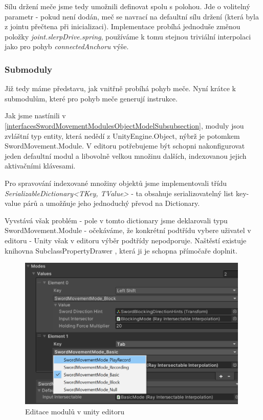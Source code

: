 Sílu držení meče jsme tedy umožnili definovat spolu s polohou. Jde o volitelný parametr - pokud není dodán, meč se navrací na defaultní sílu držení (která byla z jointu přečtena při inicializaci). Implementace probíhá jednoduše změnou položky \textit{joint.slerpDrive.spring}, používáme k tomu stejnou triviální interpolaci jako pro pohyb \textit{connectedAnchoru} výše.

\subsubsection*{Submoduly} \label{implementationSwordSubmodulesSubsubsection}

Již tedy máme představu, jak vnitřně probíhá pohyb meče. Nyní krátce k submodulům, které pro pohyb meče generují instrukce. 

Jak jsme nastínili v \ref{interfacesSwordMovementModulesObjectModelSubsubsection}, moduly jsou zvláštní typ entity, která nedědí z UnityEngine.Object, nýbrž je potomkem SwordMovement.Module. V editoru potřebujeme být schopni nakonfigurovat jeden defaultní modul a libovolně velkou množinu dalších, indexovanou jejich aktivačními klávesami.

Pro spravování indexované množiny objektů jsme implementovali třídu \textit{SerializableDictionary<TKey, TValue>} - ta obsahuje serializovatelný list key-value párů a umožňuje jeho jednoduchý převod na Dictionary. 

Vyvstává však problém - pole v tomto dictionary jsme deklarovali typu SwordMovement.Module - očekáváme, že konkrétní podtřídu vybere uživatel v editoru - Unity však v editoru výběr podtřídy nepodporuje. Naštěstí existuje knihovna SubclassPropertyDrawer \cite{SubclassPropertyDrawer}, která ji je schopna přímočaře doplnit.  

\begin{figure}[ht]\centering
  \center
  \includegraphics[width=110mm]{../img/swordMovementModulesEditor.png}
  \caption{Editace modulů v unity editoru}
  \label{obr05:swordModulePicker}
\end{figure} 

